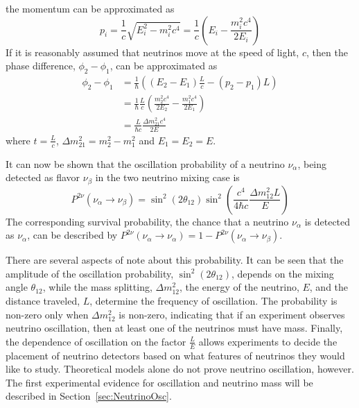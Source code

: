 the momentum can be approximated as
\begin{equation}
	p_i = \frac{1}{c}\sqrt{E^2_i-m^2_ic^4 } = \frac{1}{c}\left(E_i - \frac{m^2_ic^4}{2E_i} \right)
\end{equation}
If it is reasonably assumed that neutrinos move at the speed of light, $c$, then
the phase difference, $\phi_2 - \phi_1$, can be approximated as
\begin{equation}
\begin{split}
	\phi_2 - \phi_1 &= \frac{1}{\hbar}\left( (E_2 - E_1)\frac{L}{c} - (p_2 - p_1)L  \right)\\
	&=\frac{1}{\hbar}\frac{L}{c}\left(\frac{m_2^2c^4}{2E_2} - \frac{m_1^2c^4}{2E_1}\right) \\
	&=\frac{L}{\hbar c}\frac{\Delta m^2_{21}c^4}{2E}
\end{split}
\end{equation}
where $t = \frac{L}{c}$, $\Delta m^2_{21} = m_2^2 - m_1^2$ and $E_1 = E_2 = E$.

It can now be shown that the oscillation probability of a neutrino $\nu_\alpha$, being detected as flavor $\nu_\beta$ in the two neutrino mixing case is
\begin{equation} \label{eq:oscprob}
	P^{2\nu}(\nu_\alpha \rightarrow \nu_\beta) = \sin^2\left(2\theta_{12}\right)\sin^2\left(\frac{c^4}{4\hbar c}\frac{\Delta m^2_{12}L}{E}\right) 
\end{equation}
The corresponding survival probability, the chance that a neutrino $\nu_\alpha$ is detected as $\nu_\alpha$, can be described by $P^{2\nu}(\nu_\alpha \rightarrow \nu_\alpha) = 1 - P^{2\nu}(\nu_\alpha \rightarrow \nu_\beta)$.

There are several aspects of note about this probability. It can be seen that the amplitude of the oscillation probability, $\sin^2\left(2\theta_{12}\right)$, depends on the mixing angle $\theta_{12}$, while the mass splitting, $\Delta m^2_{12}$, the energy of the neutrino, $E$, and the distance traveled, $L$, determine the frequency of oscillation. 
The probability is non-zero only when $\Delta m^2_{12}$ is non-zero, indicating that if an experiment observes neutrino oscillation, then at least one of the neutrinos must have mass.
Finally, the dependence of oscillation on the factor $\frac{L}{E}$ allows experiments to decide the placement of neutrino detectors based on what features of neutrinos they would like to study. 
Theoretical models alone do not prove neutrino oscillation, however. The first experimental evidence for oscillation and neutrino mass will be described in Section~\ref{sec:NeutrinoOsc}.

